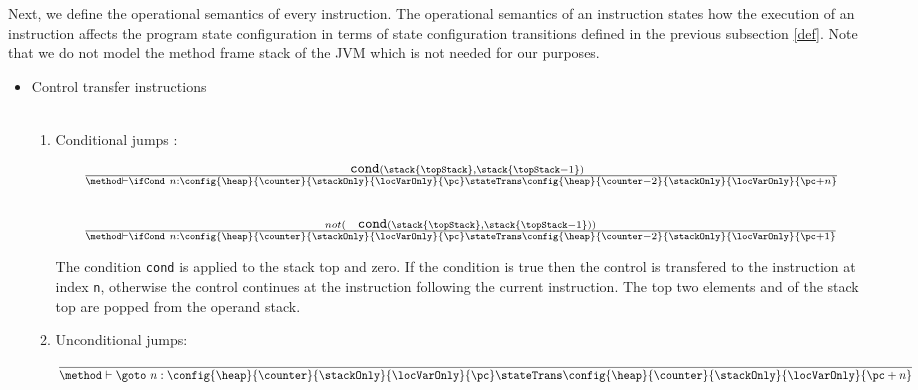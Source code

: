    
 Next, we define the operational semantics of every instruction. The operational semantics
 of an instruction states how the execution of an instruction affects the program state configuration 
 in terms of state configuration transitions defined in the previous subsection \ref{def}.
 Note that we do not model the method frame stack of the JVM which is not needed for our purposes. 

\begin{itemize}
       \item Control transfer instructions \\\\

        \begin{enumerate}
            \item Conditional jumps : \ifCond


        $$ \begin{array}{l}
                 \frac{ \mbox{ \rm \texttt{ cond}}( \stack{\topStack}, \stack{\topStack - 1}) } 			       		               
                      {\method \vdash \ifCond \ n : \config{\heap }{\counter}{\stackOnly}{\locVarOnly}{\pc}
		                      \stateTrans 
				      \config{\heap}{\counter - 2}{\stackOnly}{\locVarOnly}{\pc + n}} 
                \\
                \\
		\\
                 \frac{  not (\mbox{ \rm \texttt{ cond}}( \stack{\topStack}, \stack{\topStack - 1})) }		                             
                     {\method \vdash \ifCond \ n : \config{\heap}{\counter}{\stackOnly}{\locVarOnly}{\pc} 
		                    \stateTrans 
                                    \config{\heap}{\counter - 2}{\stackOnly}{\locVarOnly}{\pc + 1}} 
          \end{array} $$
            

	    The condition \texttt{cond} is applied to the stack top and zero. If the condition is true then the control is transfered to the instruction
	    at index \texttt{n}, otherwise the control continues at the instruction following the current instruction. The top two elements \stack{\topStack} and
              of the stack top are popped from the operand stack.
 
        \item Unconditional jumps: \goto \\
            $$ \frac{  }
	          {\method \vdash \goto \ n: \config{\heap}{\counter}{\stackOnly}{\locVarOnly}{\pc} 
		                    \stateTrans 
                                    \config{\heap}{\counter}{\stackOnly}{\locVarOnly}{\pc + n}} $$
				    

\end{enumerate}
\end{itemize}
